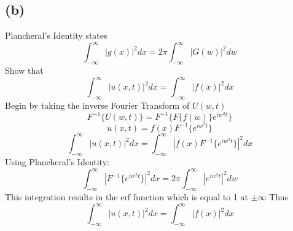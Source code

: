 \documentclass[preview,12pt]{article}
\begin{document}
    \subsection*{(b)}
        Plancheral's Identity states
        $$\int_{-\infty}^\infty |g(x)|^2dx=2\pi\int_{-\infty}^\infty|G(w)|^2dw$$
        Show that 
        $$\int_{-\infty}^\infty |u(x,t)|^2dx=\int_{-\infty}^\infty|f(x)|^2dx$$
        Begin by taking the inverse Fourier Transform of $U(w,t)$
        $$F^{-1}\{U(w,t)\}=F^{-1}\{F\{f(w)\}e^{iw^2t}\}$$
        $$u(x,t)=f(x)F^{-1}\{e^{iw^2t}\}$$
        $$\int_{-\infty}^\infty|u(x,t)|^2dx=\int_{-\infty}^\infty|f(x)F^{-1}\{e^{iw^2t}\}|^2dx$$
        Using Plancheral's Identity:
        $$\int_{-\infty}^\infty |F^{-1}\{e^{iw^2t}\}|^2 dx=2\pi\int_{-\infty}^\infty |e^{iw^2t}|^2dw$$
        This integration results in the erf function which is equal to 1 at $\pm\infty$
        Thus 
        $$\int_{-\infty}^\infty |u(x,t)|^2dx=\int_{-\infty}^\infty|f(x)|^2dx$$
\end{document}
